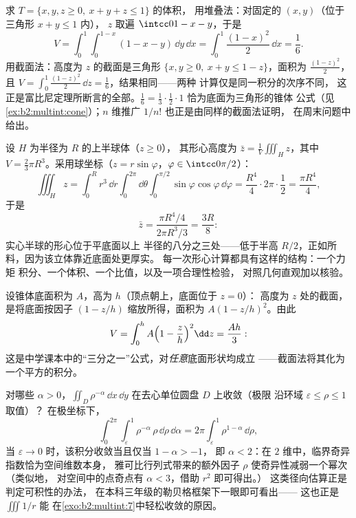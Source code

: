 \begin{example}[四面体的两次计算]
\label{ex:b2:multint:tetra}
求 $T = \{x, y, z \geq 0,\ x + y + z \leq 1\}$ 的体积，
用堆叠法：对固定的 $(x, y)$（位于三角形 $x + y \leq 1$ 内），
$z$ 取遍 $\intcc0{1 - x - y}$，于是
\[
V = \int_0^1\!\!\int_0^{1-x}(1 - x - y)\,\dd y\,\dd x
= \int_0^1\frac{(1 - x)^2}{2}\,\dd x = \frac16 .
\]
用截面法：高度为 $z$ 的截面是三角形 $\{x, y
\geq 0,\ x + y \leq 1 - z\}$，面积为 $\frac{(1-z)^2}2$，且
$V = \int_0^1\frac{(1-z)^2}2\,\dd z = \frac16$，结果相同——两种
计算仅是同一积分的次序不同，
这正是富比尼定理所断言的全部。$\frac16 =
\frac13\cdot\frac12\cdot1$ 恰为底面为三角形的锥体
公式（见\cref{ex:b2:multint:cone}）；$n$ 维推广 $1/n!$
也正是由同样的截面法证明，
在周末问题中给出。
\end{example}

\begin{example}[半球体的形心]\label{ex:b2:multint:centroid}
设 $H$ 为半径为 $R$ 的上半球体（$z \geq 0$），
其形心高度为 $\bar z = \frac1{V}\iiint_H z$，其中 $V =
\frac23\pi R^3$。采用球坐标（$z =
r\sin\varphi$，$\varphi \in \intcc0{\pi/2}$）：
\[
\iiint_H z
= \int_0^R r^3\,\dd r\int_0^{2\pi}\dd\theta
\int_0^{\pi/2}\sin\varphi\cos\varphi\,\dd\varphi
= \frac{R^4}4\cdot2\pi\cdot\frac12 = \frac{\pi R^4}4 ,
\]
于是
\[
\bar z = \frac{\pi R^4/4}{2\pi R^3/3} = \frac{3R}8 :
\]
实心半球的形心位于平底面以上
半径的八分之三处——低于半高
$R/2$，正如所料，因为该立体靠近底面处更厚实。
每一次形心计算都具有这样的结构：一个力矩
积分、一个体积、一个比值，以及一项合理性检验，
对照几何直观加以核验。
\end{example}

\begin{example}[用截面法求体积：锥体]\label{ex:b2:multint:cone}
设锥体底面积为 $A$，高为 $h$（顶点朝上，底面位于 $z = 0$）：
高度为 $z$ 处的截面，是将底面按因子 $(1 -
z/h)$ 缩放所得，面积为 $A(1 - z/h)^2$。由此
\[
V = \int_0^h A\Bigl(1 - \frac zh\Bigr)^2\dd z = \frac{Ah}{3} :
\]
这是中学课本中的“三分之一”公式，对\emph{任意}底面形状均成立
——截面法将其化为一个平方的积分。
\end{example}

\begin{example}\label{ex:b2:multint:threshold}
对哪些 $\alpha > 0$，$\iint_{D}\rho^{-\alpha}\,\dd
x\,\dd y$ 在去心单位圆盘 $D$ 上收敛（极限
沿环域 $\varepsilon \leq \rho \leq 1$ 取值）？
在极坐标下，
\[
\int_0^{2\pi}\!\!\int_\varepsilon^1\rho^{-\alpha}\,
\rho\,\dd\rho\,\dd\alpha
= 2\pi\int_\varepsilon^1\rho^{1-\alpha}\,\dd\rho ,
\]
当 $\varepsilon \to 0$ 时，该积分收敛当且仅当 $1 - \alpha > -1$，
即 $\alpha < 2$：在 $2$ 维中，临界奇异指数恰为空间维数本身，
雅可比行列式带来的额外因子 $\rho$
使奇异性减弱一个幂次（类似地，
对空间中的点奇点有 $\alpha < 3$，借助 $r^2$ 即可得出。）
这类径向估算正是判定可积性的办法，
在本科三年级的勒贝格框架下一眼即可看出——
这也正是 $\iiint 1/r$ 能
在\cref{exo:b2:multint:7}中轻松收敛的原因。
\end{example}

